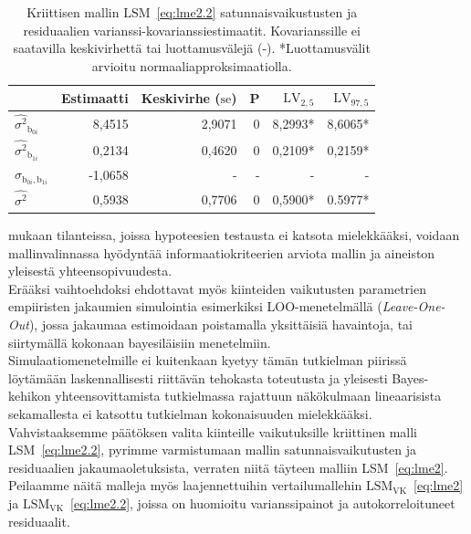 \documentclass[finnish]{docopts}
\begin{document}
\begin{table}[H]
\centering
\begin{tabular}{lrrrrr}
\toprule
  & Estimaatti & Keskivirhe ($\text{se}$) & P & $\text{LV}_{2,5}$ & $\text{LV}_{97,5}$\\
\midrule
$\hat{\sigma^2}_{\text{b}_{0i}}$ & 8,4515 & 2,9071 & 0 & 8,2993* & 8,6065* \\
$\hat{\sigma^2}_{\text{b}_{1i}}$ & 0,2134 & 0,4620 & 0 & 0,2109* & 0,2159* \\
$\hat{\sigma}_{\text{b}_{0i}, \text{b}_{1i}}$ & -1,0658 & - & - & - & - \\
\addlinespace
$\hat{\sigma^2}$ & 0,5938 & 0,7706 & 0 & 0,5900* & 0.5977* \\
\bottomrule
\end{tabular}
\caption{Kriittisen mallin $\text{LSM}$~\ref{eq:lme2.2} satunnaisvaikustusten ja residuaalien varianssi-kovarianssiestimaatit. Kovarianssille ei saatavilla keskivirhettä tai luottamusvälejä (-). *Luottamusvälit arvioitu normaaliapproksimaatiolla.}
\label{table:lme2.2rand}
\end{table}

\cite{burzykowski13} mukaan tilanteissa, joissa hypoteesien testausta ei katsota mielekkääksi, voidaan mallinvalinnassa hyödyntää informaatiokriteerien arviota mallin ja aineiston yleisestä yhteensopivuudesta.\\ 

Erääksi vaihtoehdoksi \cite{burzykowski13} ehdottavat myös kiinteiden vaikutusten parametrien empiiristen jakaumien simulointia esimerkiksi LOO-menetelmällä (\textit{Leave-One-Out}), jossa jakaumaa estimoidaan poistamalla yksittäisiä havaintoja, tai siirtymällä kokonaan bayesiläisiin menetelmiin.\\

Simulaatiomenetelmille ei kuitenkaan kyetyy tämän tutkielman piirissä löytämään laskennallisesti riittävän tehokasta toteutusta ja yleisesti Bayes-kehikon yhteensovittamista tutkielmassa rajattuun näkökulmaan lineaarisista sekamallesta ei katsottu tutkielman kokonaisuuden mielekkääksi.\\ 

Vahvistaaksemme päätöksen valita kiinteille vaikutuksille kriittinen malli LSM~\ref{eq:lme2.2}, pyrimme varmistumaan mallin satunnaisvaikutusten ja residuaalien jakaumaoletuksista, verraten niitä täyteen malliin LSM~\ref{eq:lme2}. Peilaamme näitä malleja myös laajennettuihin vertailumallehin $\text{LSM}_{\text{VK}}$~\ref{eq:lme2} ja $\text{LSM}_{\text{VK}}$~\ref{eq:lme2.2}, joissa on huomioitu varianssipainot ja autokorreloituneet residuaalit.\\
\end{document}
